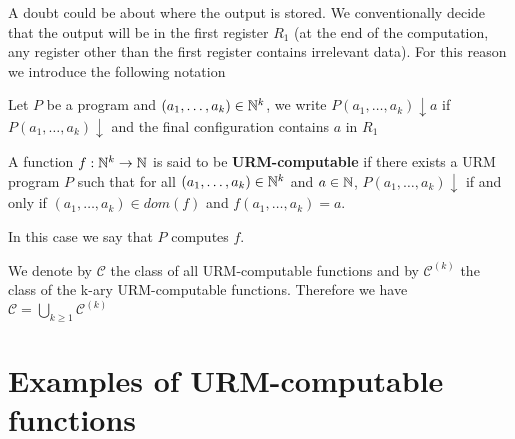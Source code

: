 A doubt could be about where the output is stored. 
We conventionally decide that the output will be in the first register $ R_1 $ (at the end of the computation, any register other than the first register contains irrelevant data). 
For this reason we introduce the following notation

\begin{notation}
  Let $P$ be a program and $(a_1,\dots,a_k) \in \mathbb{N}^k$, we write
  $P(a_1,\dots,a_k)\downarrow a$ if $P(a_1,\dots,a_k) \downarrow$ and
  the final configuration contains $a$ in $R_1$
\end{notation}

\begin{definition}
  A function $f:\mathbb{N}^k\rightarrow\mathbb{N}$ is said to be
  \textbf{URM-computable} if there exists a URM program $P$ such that for all
  $(a_1,\dots,a_k) \in \mathbb{N}^k$ and $ a\in\mathbb{N}$,
  $P(a_1,\dots,a_k)\downarrow$ if and only if $(a_1,\dots,a_k)\in dom(f)$ and
  $f(a_1,\dots,a_k) = a$. 
  
  In this case we say that $P$ computes $f$.

  We denote by $\mathcal{C}$ the class of all URM-computable
  functions and by $\mathcal{C}^{(k)}$ the class of the k-ary
  URM-computable functions.
  Therefore we have
  $\mathcal{C} = \bigcup_{k\geq 1} \mathcal{C}^{(k)}$
\end{definition}

\section{Examples of URM-computable functions}

